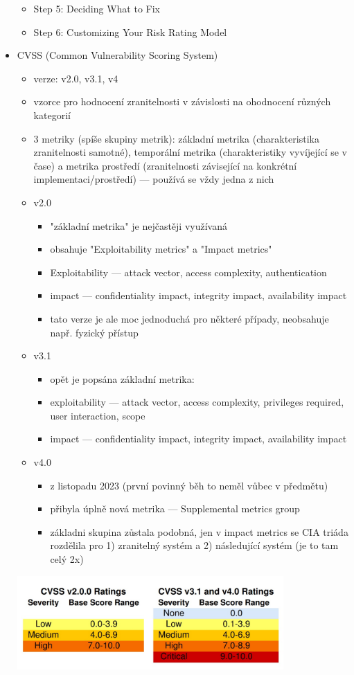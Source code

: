 \begin{itemize}
\begin{itemize}
		\item Step 5: Deciding What to Fix
		\item Step 6: Customizing Your Risk Rating Model
	\end{itemize}
	\item CVSS (Common Vulnerability Scoring System)
	\begin{itemize}
		\item verze: v2.0, v3.1, v4
		\item vzorce pro hodnocení zranitelnosti v závislosti na ohodnocení různých kategorií
		\item 3 metriky (spíše skupiny metrik): základní metrika (charakteristika zranitelnosti samotné), temporální metrika (charakteristiky vyvíjející se v čase) a metrika prostředí (zranitelnosti závisející na konkrétní implementaci/prostředí) --- používá se vždy jedna z nich 
		\item v2.0
		\begin{itemize}
			\item "základní metrika" je nejčastěji využívaná
			\item obsahuje "Exploitability metrics" a "Impact metrics"
			\item Exploitability --- attack vector, access complexity, authentication
			\item impact --- confidentiality impact, integrity impact, availability impact
			\item tato verze je ale moc jednoduchá pro některé případy, neobsahuje např. fyzický přístup
		\end{itemize}
		\item v3.1
		\begin{itemize}
			\item opět je popsána základní metrika:
			\item exploitability --- attack vector, access complexity, privileges required, user interaction, scope
			\item impact --- confidentiality impact, integrity impact, availability impact
		\end{itemize}
		\item v4.0
		\begin{itemize}
			\item z listopadu 2023 (první povinný běh to neměl vůbec v předmětu)
			\item přibyla úplně nová metrika --- Supplemental metrics group
			\item základni skupina zůstala podobná, jen v impact metrics se CIA triáda rozdělila pro 1) zranitelný systém a 2) následující systém (je to tam celý 2x)
		\end{itemize}
	\end{itemize}
	\includegraphics[width=0.8\textwidth]{img/OB-15_0.jpg}
\end{itemize}

